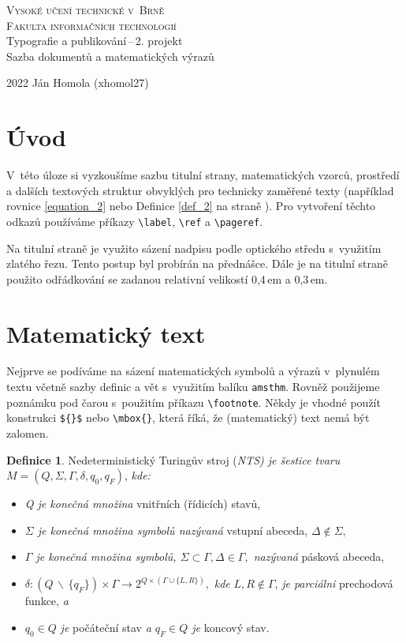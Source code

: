 \documentclass[a4paper, 11pt, twocolumn]{article}
\theoremstyle{definition}
\newtheorem{definition}{Definice}
\begin{document}
\begin{titlepage}
\begin{center}
    \Huge
    \textsc{{\Huge Vysoké učení technické v~Brně}\\[0.4 em]
            {\huge Fakulta informačních technologií}}\\
    {\LARGE Typografie a publikování\,--\,2. projekt\\[0.3 em]
    Sazba dokumentů a matematických výrazů}
\end{center}
{\Large 2022 \hfill Ján Homola (xhomol27)}
\end{titlepage}
    


\section*{Úvod}
V~této úloze si vyzkoušíme sazbu titulní strany, matematických vzorců, prostředí a dalších textových struktur obvyklých pro technicky zaměřené texty (například rovnice \eqref{equation_2} nebo Definice \ref{def_2} na straně \pageref{def_2}). Pro vytvoření těchto odkazů používáme příkazy \verb|\label|, \verb|\ref| a \verb|\pageref|. \par
Na titulní straně je využito sázení nadpisu podle optického středu s~využitím zlatého řezu. Tento postup byl probírán na přednášce. Dále je na titulní straně použito odřádkování se zadanou relativní velikostí 0,4\,em a 0,3\,em.

\section{Matematický text}
Nejprve se podíváme na sázení matematických symbolů a výrazů v~plynulém textu včetně sazby definic a vět s~využitím balíku \texttt{amsthm}. Rovněž použijeme poznámku pod čarou s~použitím příkazu \verb|\footnote|. Někdy je vhodné použít konstrukci \verb|${}$| nebo \verb|\mbox{}|, která říká, že (matematický) text nemá být zalomen. 

\begin{definition}
\label{def_1}
Nedeterministický Turingův stroj (\emph{NTS) je šestice tvaru} $M = (Q, \Sigma, \Gamma, \delta, q_0, q_F)$, \emph{kde:}
\begin{itemize}
    \item \emph{Q je konečná množina} vnitřních (řídicích) stavů, 
    \item \emph{$\Sigma$ je konečná množina symbolů nazývaná} vstupní abeceda, $\Delta \notin \Sigma,$
    \item \emph{$\Gamma$ je konečná množina symbolů, $\Sigma \subset \Gamma, \Delta \in \Gamma,$ nazývaná} pásková abeceda,
    \item  $\delta:(Q \,\backslash \,\{q_F\}) \times \Gamma \rightarrow 2^{Q \times(\Gamma \cup\{L, R\})},$ \emph{kde} $L, R \notin \Gamma$, \emph{je parciálni} prechodová funkce, \emph{a}
    \item $q_0 \in Q$ \emph{je} počáteční stav \emph{a $q_F \in Q$ je} koncový stav.
\end{itemize}
\end{definition}
\end{document}
